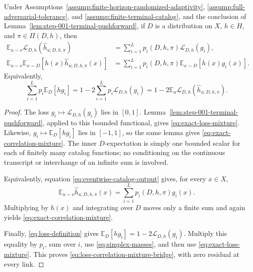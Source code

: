 \begin{proposition}
\label{prop:step-001-exact-mixtures}
Under Assumptions~\ref{assump:finite-horizon-randomized-adaptivity},
\ref{assump:full-adversarial-tolerance}, and
\ref{assump:finite-terminal-catalog}, and the conclusion of
Lemma~\ref{lem:step-001-terminal-pushforward}, if $D$ is a distribution on
$X$, $h\in H$, and $\pi\in\Pi(D,h)$, then
\begin{align}
\mathbb E_{u\sim\nu}\mathcal L_{D,h}(\widehat h_{u;D,h,\pi})
&=\sum_{i=1}^Lp_i(D,h,\pi)\mathcal L_{D,h}(g_i),
\label{eq:exact-loss-mixture}\\
\mathbb E_{u\sim\nu}\mathbb E_{x\sim D}
[h(x)\widehat h_{u;D,h,\pi}(x)]
&=\sum_{i=1}^Lp_i(D,h,\pi)
\mathbb E_{x\sim D}[h(x)g_i(x)].
\label{eq:exact-correlation-mixture}
\end{align}
Equivalently,
\begin{equation}\label{eq:loss-correlation-mixture-bridge}
\sum_{i=1}^Lp_i\mathbb E_D[h g_i]
=1-2\sum_{i=1}^Lp_i\mathcal L_{D,h}(g_i)
=1-2\mathbb E_u\mathcal L_{D,h}(\widehat h_{u;D,h,\pi}).
\end{equation}
\end{proposition}

\begin{proof}
The loss $g_i\mapsto\mathcal L_{D,h}(g_i)$ lies in $[0,1]$.
Lemma~\ref{lem:step-001-terminal-pushforward}, applied to this bounded
functional, gives \eqref{eq:exact-loss-mixture}.  Likewise,
$g_i\mapsto\mathbb E_D[hg_i]$ lies in $[-1,1]$, so the same lemma gives
\eqref{eq:exact-correlation-mixture}.  The inner $D$-expectation is simply
one bounded scalar for each of finitely many catalog functions; no
conditioning on the continuous transcript or interchange of an infinite sum
is involved.

Equivalently, equation \eqref{eq:eventwise-catalog-output} gives, for every
$x\in X$,
\[
\mathbb E_{u\sim\nu}\widehat h_{u;D,h,\pi}(x)
=\sum_{i=1}^Lp_i(D,h,\pi)g_i(x).
\]
Multiplying by $h(x)$ and integrating over $D$ moves only a finite sum and
again yields \eqref{eq:exact-correlation-mixture}.

Finally, \eqref{eq:loss-definition} gives
$\mathbb E_D[hg_i]=1-2\mathcal L_{D,h}(g_i)$.  Multiply this equality by
$p_i$, sum over $i$, use \eqref{eq:simplex-masses}, and then use
\eqref{eq:exact-loss-mixture}.  This proves
\eqref{eq:loss-correlation-mixture-bridge}, with zero residual at every link.
\end{proof}

